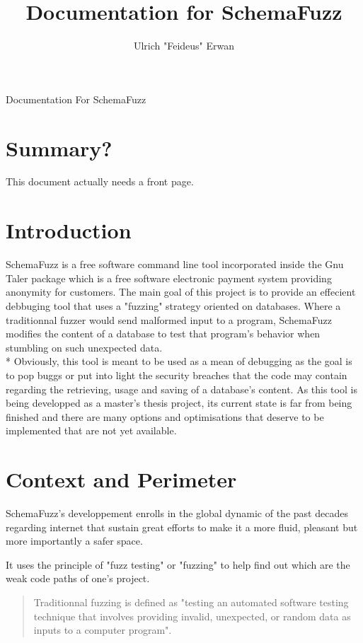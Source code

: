 \documentclass{article}
\title{Documentation for SchemaFuzz}
\author{Ulrich "Feideus" Erwan}
\begin{document}
\begin{empfile}
	
\maketitle Documentation For SchemaFuzz
	\section{Summary?}
		This document actually needs a front page.
	\section{Introduction}
	
SchemaFuzz is a free software command line tool incorporated inside the Gnu Taler package 
which is a free software electronic payment system providing anonymity for customers.
The main goal of this project is to provide an effecient debbuging tool that uses a "fuzzing" strategy oriented on databases.  
Where a traditionnal fuzzer would send malformed input to a program, SchemaFuzz modifies the content of a database to test that program's behavior when stumbling on such unexpected data. \\*
Obviously, this tool is meant to be used as a mean of debugging as the goal is to pop buggs or put into light the security breaches that the code may contain regarding the retrieving, usage and saving of a database's content.
As this tool is being developped as a master's thesis project, its current state is far from being finished and there are many options and optimisations that deserve to be implemented that are not yet available.

	
	\section{Context and Perimeter}
SchemaFuzz's developpement enrolls in the global dynamic of the past decades regarding internet  that sustain great efforts to make it a more fluid, pleasant but more importantly a safer space.

It uses the principle of "fuzz testing" or "fuzzing" to help find out which are the weak code paths of one's project. 
				\begin{quotation}
Traditionnal fuzzing is defined as "testing an automated software testing technique that involves providing invalid, unexpected, or random data as inputs to a computer program".
				\end{quotation}		


\end{empfile}
\end{document}
